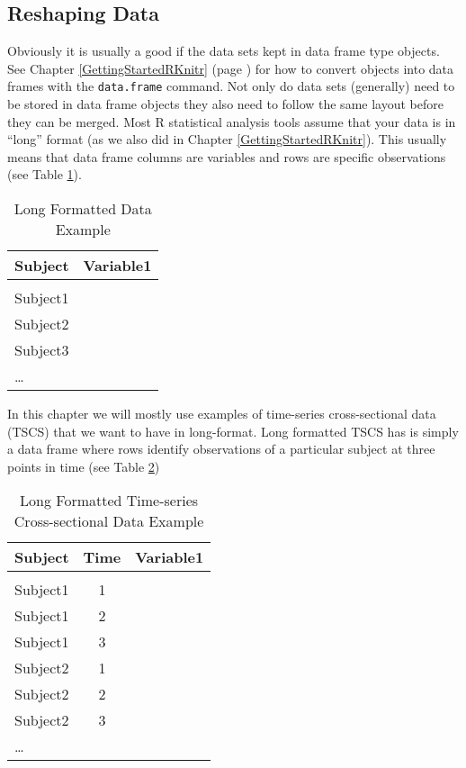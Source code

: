 \subsection{Reshaping Data}

Obviously it is usually a good if the data sets kept in data frame type objects. See Chapter \ref{GettingStartedRKnitr} (page \pageref{data.frame}) for how to convert objects into data frames with the \texttt{data.frame} command. Not only do data sets (generally) need to be stored in data frame objects they also need to follow the same layout before they can be merged. Most R statistical analysis tools assume that your data is in ``long'' format (as we also did in Chapter \ref{GettingStartedRKnitr}). This usually means that data frame columns are variables and rows are specific observations (see Table \ref{ExampleLong}).

\begin{table}[h!]
    \caption{Long Formatted Data Example}
    \label{ExampleLong}
    \begin{tabular}{l c}
        \\[0.15cm]
        \hline
        Subject & Variable1 \\
        \hline \\[0.1cm]
        Subject1 & \\[0.25cm]
        Subject2 & \\[0.25cm]
        Subject3 & \\[0.25cm]
        \ldots & \\[0.25cm]
        \hline
    \end{tabular}
\end{table}

\noindent In this chapter we will mostly use examples of time-series cross-sectional data (TSCS) that we want to have in long-format. Long formatted TSCS has is simply a data frame where rows identify observations of a particular subject at three points in time (see Table \ref{ExampleTSCSLong})

 \begin{table}[h!]
    \caption{Long Formatted Time-series Cross-sectional Data Example}
    \label{ExampleTSCSLong}
    \begin{tabular}{l c c}
        \\[0.15cm]
        \hline
        Subject & Time & Variable1 \\
        \hline \\[0.1cm]
        Subject1 & 1 & \\[0.25cm]
        Subject1 & 2 & \\[0.25cm]
        Subject1 & 3 & \\[0.25cm]
        Subject2 & 1 & \\[0.25cm]
        Subject2 & 2 & \\[0.25cm]
        Subject2 & 3 & \\[0.25cm]
        \ldots & & \\[0.25cm]
        \hline
    \end{tabular}
\end{table}

